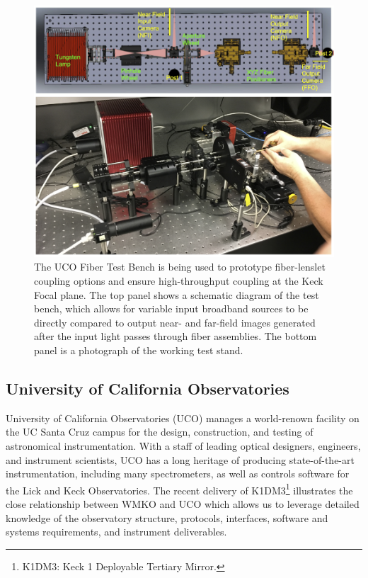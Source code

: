 \documentclass[oneside,11pt]{amsart}
\begin{document}
\begin{figure}[h!]
 \vskip -0.1in
 \includegraphics[width=\textwidth]{figs/fig_test_bench.png}
 \caption{\small The UCO Fiber Test Bench is being used to prototype fiber-lenslet coupling options and ensure high-throughput coupling at the Keck Focal plane.  The top panel shows a schematic diagram of the test bench, which allows for variable input broadband sources to be directly compared to output near- and far-field images generated after the input light passes through fiber assemblies.  The bottom panel is a photograph of the working test stand.   }\label{fig:testbench}
\end{figure}

\subsection{University of California Observatories}

University of California Observatories (UCO) manages a world-renown facility on the UC Santa Cruz campus for the
design, construction, and testing of astronomical instrumentation.  With a staff of leading optical designers,
engineers, and instrument scientists, UCO has a long heritage of producing state-of-the-art instrumentation, including
many spectrometers, as well as controls software for the Lick and Keck Observatories.  The recent delivery of K1DM3\footnote{K1DM3: Keck 1 Deployable Tertiary Mirror.} illustrates the close relationship between WMKO and UCO which allows us to leverage detailed knowledge of the observatory structure, protocols, interfaces, software and systems requirements, and instrument deliverables.
\end{document}
